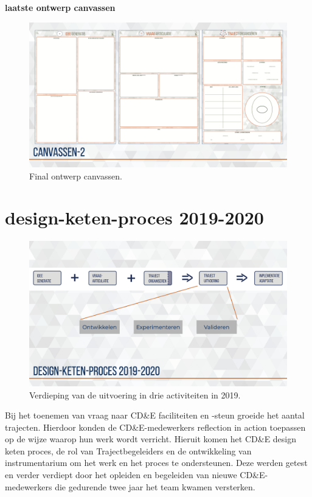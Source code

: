 \documentclass[
]{book}
\begin{document}
\textbf{laatste ontwerp canvassen}

\begin{figure}
\includegraphics[width=26.67in]{data/keynote-slides/20200430-CDE-Designprocess/20200430-CDE-Designprocess.025} \caption{Final ontwerp canvassen.}\label{fig:unnamed-chunk-33}
\end{figure}

\hypertarget{design-keten-proces-2019-2020}{%
\section{design-keten-proces 2019-2020}\label{design-keten-proces-2019-2020}}

\begin{figure}
\includegraphics[width=26.67in]{data/keynote-slides/20200430-CDE-Designprocess/20200430-CDE-Designprocess.026} \caption{Verdieping van de uitvoering in drie activiteiten in 2019. }\label{fig:unnamed-chunk-34}
\end{figure}

Bij het toenemen van vraag naar CD\&E faciliteiten en -steun groeide het aantal trajecten. Hierdoor konden de CD\&E-medewerkers reflection in action toepassen op de wijze waarop hun werk wordt verricht. Hieruit komen het CD\&E design keten proces, de rol van Trajectbegeleiders en de ontwikkeling van instrumentarium om het werk en het proces te ondersteunen. Deze werden getest en verder verdiept door het opleiden en begeleiden van nieuwe CD\&E-medewerkers die gedurende twee jaar het team kwamen versterken.
\end{document}
